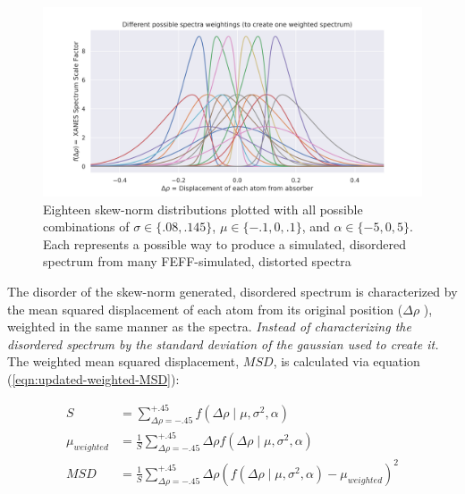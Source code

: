 \begin{figure}[h!]
	\centering
	\includegraphics[width=\linewidth]{Chapters/Figures/skewnorm_options.png}
	\caption[Simulated Disordered Spectrum Weightings]{Eighteen skew-norm distributions plotted with all possible combinations of $ \sigma \in \{.08, .145\} $, $ \mu \in \{-.1, 0, .1\} $, and $ \alpha \in \{-5,0,5\} $. Each represents a possible way to produce a simulated, disordered spectrum from many FEFF-simulated, distorted spectra} 
	\label{fig:skew-norm-options}
\end{figure}

The disorder of the skew-norm generated, disordered spectrum is characterized by the mean squared displacement of each atom from its original position ($ \Delta\rho $ ), weighted in the same manner as the spectra. \textit{Instead of characterizing the disordered spectrum by the standard deviation of the gaussian used to create it.} The weighted mean squared displacement, $ MSD $, is calculated via equation (\ref{eqn:updated-weighted-MSD}):


\begin{align}
	\label{eqn:updated-weighted-MSD}
	S &= \sum_{\Delta\rho=-.45}^{+.45} f\left(\Delta \rho \mid \mu, \sigma^2, \alpha \right) \\
	\mu_{weighted} &= \frac{1}{S} \sum_{\Delta\rho=-.45}^{+.45} \Delta\rho f\left(\Delta \rho \mid \mu, \sigma^2, \alpha \right) \\
	MSD &= \frac{1}{S} \sum_{\Delta\rho=-.45}^{+.45} \Delta \rho \left( f ( \Delta \rho \mid \mu, \sigma^2, \alpha ) - \mu_{weighted} \right) ^2
\end{align}

